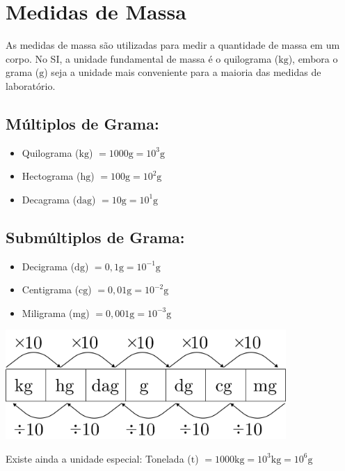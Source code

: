\section{Medidas de Massa}
As medidas de massa são utilizadas para medir a quantidade
de massa em um corpo. No SI, a unidade fundamental de massa é
o quilograma ($\mathrm{kg}$), embora o grama ($\mathrm{g}$) seja a unidade mais
conveniente para a maioria das medidas de laboratório.
\begin{multicols}{2}
	\subsection{Múltiplos de Grama:}
		\begin{itemize}
		    \item Quilograma ($\mathrm{kg}$) $= 1000 \mathrm{g} = 10^3 \mathrm{g}$
		    \item Hectograma ($\mathrm{hg}$) $= 100 \mathrm{g} = 10^2 \mathrm{g}$
		    \item Decagrama ($\mathrm{dag}$) $= 10 \mathrm{g} = 10^1 \mathrm{g}$
		\end{itemize}
	
	\subsection{Submúltiplos de Grama:}
		\begin{itemize}
		    \item Decigrama ($\mathrm{dg}$) $= 0,1 \mathrm{g} = 10^{-1} \mathrm{g}$
		    \item Centigrama ($\mathrm{cg}$) $= 0,01 \mathrm{g} = 10^{-2} \mathrm{g}$
		    \item Miligrama ($\mathrm{mg}$) $= 0,001 \mathrm{g} = 10^{-3} \mathrm{g}$
		\end{itemize}
		\columnbreak
     \bigskip
     \noindent   %
     \begin{minipage}{\linewidth}
    \centering 
    \includegraphics[width=0.8\textwidth]{imagens/matematicaBasica/sistemaDeUnidades/MultiplosDeGrama.pdf}
\end{minipage}
   \end{multicols} 
Existe ainda a unidade especial:
Tonelada ($\mathrm{t}$) $= 1000 \mathrm{kg} = 10^3 \mathrm{kg} = 10^6 \mathrm{g}$

